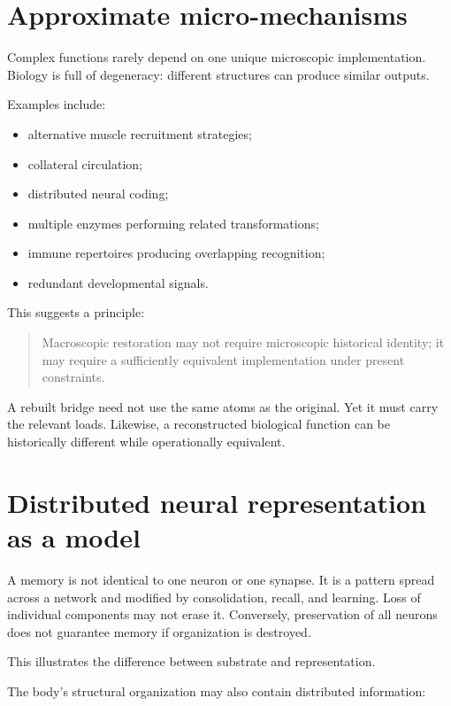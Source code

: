 \section{Approximate micro-mechanisms}

Complex functions rarely depend on one unique microscopic implementation. Biology is full of degeneracy: different structures can produce similar outputs.

Examples include:

\begin{itemize}
\tightlist
\item
  alternative muscle recruitment strategies;
\item
  collateral circulation;
\item
  distributed neural coding;
\item
  multiple enzymes performing related transformations;
\item
  immune repertoires producing overlapping recognition;
\item
  redundant developmental signals.
\end{itemize}

This suggests a principle:

\begin{quote}
Macroscopic restoration may not require microscopic historical identity; it may require a sufficiently equivalent implementation under present constraints.
\end{quote}

A rebuilt bridge need not use the same atoms as the original. Yet it must carry the relevant loads. Likewise, a reconstructed biological function can be historically different while operationally equivalent.

\section{Distributed neural representation as a model}

A memory is not identical to one neuron or one synapse. It is a pattern spread across a network and modified by consolidation, recall, and learning. Loss of individual components may not erase it. Conversely, preservation of all neurons does not guarantee memory if organization is destroyed.

This illustrates the difference between substrate and representation.

The body's structural organization may also contain distributed information:

